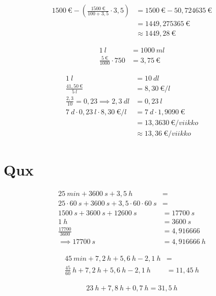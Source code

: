 \begin{align*}
1500\ \text{€} - \left ( \frac{1500\ \text{€}}{100 + 3,5}  \cdot 3,5 \right ) &= 1500\ \text{€} - 50,724635\ \text{€} \\
&= 1449,275365\ \text{€}\\
&\approx 1449,28\ \text{€}
\end{align*}






\begin{align*}
1\ l &= 1000\ ml \\
\frac{5\ \text{€}}{1000} \cdot 750 &= 3,75\ \text{€}
\end{align*}




\begin{align*}
1\ l &= 10\ dl \\
\frac{41,50\ \text{€}}{5\ l} &= 8,30\ \text{€}/l \\
\frac{2,3}{10} = 0,23 \implies 2,3\ dl &= 0,23\ l \\
7\ d \cdot 0,23\ l \cdot 8,30\ \text{€}/l &= 7\ d \cdot 1,9090\ \text{€} \\
&= 13,3630\ \text{€}/viikko \\
&\approx 13,36\ \text{€}/viikko
\end{align*}


\chapter{Qux}


\begin{align*}
25\ min + 3600\ s + 3,5\ h &= \\
25 \cdot 60\ s + 3600\ s + 3,5 \cdot 60 \cdot 60\ s &= \\
1500\ s + 3600\ s + 12600\ s &= 17700\ s \\
1\ h &= 3600\ s \\
\frac{17700}{3600} &= 4,916666 \\
\implies 17700\ s &= 4,916666\ h
\end{align*}




\begin{align*}
45\ min + 7,2\ h + 5,6\ h - 2,1\ h &= \\
\frac{45}{60}\ h + 7,2\ h + 5,6\ h - 2,1\ h &= 11,45\ h
\end{align*}




\begin{align*}
23\ h + 7,8\ h + 0,7\ h = 31,5\ h
\end{align*}




